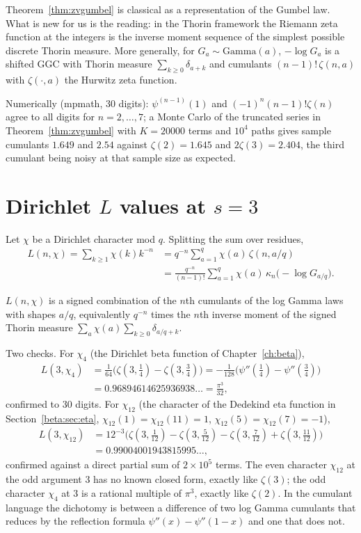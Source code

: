 Theorem~\ref{thm:zvgumbel} is classical as a representation of the Gumbel law. What is new for us is the reading: in the Thorin framework the Riemann zeta function at the integers is the inverse moment sequence of the simplest possible discrete Thorin measure. More generally, for $G_a\sim\mathrm{Gamma}(a)$, $-\log G_a$ is a shifted GGC with Thorin measure $\sum_{k\ge0}\delta_{a+k}$ and cumulants $(n-1)!\,\zeta(n,a)$ with $\zeta(\cdot,a)$ the Hurwitz zeta function.

Numerically (mpmath, 30 digits): $\psi^{(n-1)}(1)$ and $(-1)^n(n-1)!\zeta(n)$ agree to all digits for $n=2,\dots,7$; a Monte Carlo of the truncated series in Theorem~\ref{thm:zvgumbel} with $K=20000$ terms and $10^4$ paths gives sample cumulants $1.649$ and $2.54$ against $\zeta(2)=1.645$ and $2\zeta(3)=2.404$, the third cumulant being noisy at that sample size as expected.

\section{Dirichlet $L$ values at $s=3$}

Let $\chi$ be a Dirichlet character mod $q$. Splitting the sum over residues,
\begin{align*}
L(n,\chi)=\sum_{k\ge1}\chi(k)k^{-n}&=q^{-n}\sum_{a=1}^{q}\chi(a)\,\zeta(n,a/q)\\
&=\frac{q^{-n}}{(n-1)!}\sum_{a=1}^q\chi(a)\,\kappa_n\!\big(-\log G_{a/q}\big).
\end{align*}

\begin{corollary}
$L(n,\chi)$ is a signed combination of the $n$th cumulants of the log Gamma laws with shapes $a/q$, equivalently $q^{-n}$ times the $n$th inverse moment of the signed Thorin measure $\sum_a\chi(a)\sum_{k\ge0}\delta_{a/q+k}$.
\end{corollary}

Two checks. For $\chi_4$ (the Dirichlet beta function of Chapter~\ref{ch:beta}),
\begin{align*}
L(3,\chi_4)&=\tfrac1{64}\big(\zeta(3,\tfrac14)-\zeta(3,\tfrac34)\big)
=-\tfrac1{128}\big(\psi''(\tfrac14)-\psi''(\tfrac34)\big)\\
&=0.96894614625936938\ldots=\frac{\pi^3}{32},
\end{align*}
confirmed to 30 digits. For $\chi_{12}$ (the character of the Dedekind eta function in Section~\ref{beta:sec:eta}, $\chi_{12}(1)=\chi_{12}(11)=1$, $\chi_{12}(5)=\chi_{12}(7)=-1$),
\begin{align*}
L(3,\chi_{12})&=12^{-3}\big(\zeta(3,\tfrac1{12})-\zeta(3,\tfrac5{12})-\zeta(3,\tfrac7{12})+\zeta(3,\tfrac{11}{12})\big)\\
&=0.99004001943815995\ldots,
\end{align*}
confirmed against a direct partial sum of $2\times10^5$ terms. The even character $\chi_{12}$ at the odd argument $3$ has no known closed form, exactly like $\zeta(3)$; the odd character $\chi_4$ at $3$ is a rational multiple of $\pi^3$, exactly like $\zeta(2)$. In the cumulant language the dichotomy is between a difference of two log Gamma cumulants that reduces by the reflection formula $\psi''(x)-\psi''(1-x)$ and one that does not.

